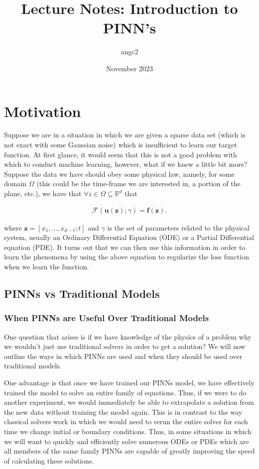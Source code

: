 \documentclass{article}
\title{Lecture Notes: Introduction to PINN's}
\author{angc2 }
\date{November 2023}
\begin{document}
\maketitle


\section{Motivation}

Suppose we are in a situation in which we are given a sparse data set (which is not exact with some Gaussian noise) which is insufficient to learn our target function. At first glance, it would seem that this is not a good problem with which to conduct machine learning, however, what if we knew a little bit more? Suppose the data we have should obey some physical law, namely, for some domain $\Omega$ (this could be the time-frame we are interested in, a portion of the plane, etc.), we have that $\forall z \in \Omega \subseteq \mathbb{R}^d$ that

\begin{align}
    \mathcal{F}(\textbf{u}(\textbf{z}); \gamma) = \textbf{f}(\textbf{z}).
\end{align}

where $\textbf{z} = [x_1,...,x_{d-t}; t]$ and $\gamma$ is the set of parameters related to the physical system, usually an Ordinary Differential Equation (ODE) or a Partial Differential equation (PDE). It turns out that we can then use this information in order to learn the phenomena by using the above equation to regularize the loss function when we learn the function.

\subsection{PINNs vs Traditional Models}

\subsubsection{When PINNs are Useful Over Traditional Models}

One question that arises is if we have knowledge of the physics of a problem why we wouldn't just use traditional solvers in order to get a solution?  We will now outline the ways in which PINNs are used and when they should be used over traditional models. 

One advantage is that once we have trained our PINNs model, we have effectively trained the model to solve an entire family of equations. Thus, if we were to do another experiment, we would immediately be able to extrapolate a solution from the new data without training the model again. This is in contrast to the way classical solvers work in which we would need to rerun the entire solver for each time we change initial or boundary conditions. Thus, in some situations in which we will want to quickly and efficiently solve numerous ODEs or PDEs which are all members of the same family PINNs are capable of greatly improving the speed of calculating these solutions.
\end{document}

